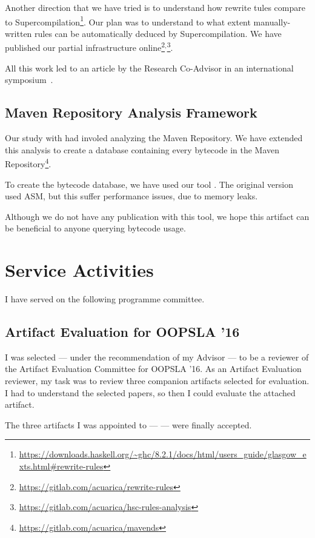 Another direction that we have tried is to understand how rewrite tules compare to Supercompilation\footnote{\url{https://downloads.haskell.org/~ghc/8.2.1/docs/html/users_guide/glasgow_exts.html\#rewrite-rules}}.
Our plan was to understand to what extent manually-written rules can be automatically deduced by Supercompilation.
We have published our partial infrastructure online\footnote{\url{https://gitlab.com/acuarica/rewrite-rules}}$^{,}$\footnote{\url{https://gitlab.com/acuarica/hsc-rules-analysis}}.

All this work led to an article by the Research Co-Advisor in an international symposium~\cite{Nystrom:2017bp}.

\subsection*{Maven Repository Analysis Framework}

Our study with \smu{} had involed analyzing the Maven Repository.
We have extended this analysis to create a database containing every bytecode in the Maven Repository\footnote{\url{https://gitlab.com/acuarica/mavends}}.

To create the bytecode database, we have used our tool \jnif{}.
The original version used ASM, but this suffer performance issues, due to memory leaks. 

Although we do not have any publication with this tool, we hope this artifact can be beneficial to anyone querying bytecode usage.

\section{Service Activities} \label{sec:service}

I have served on the following programme committee.

\subsection*{Artifact Evaluation for OOPSLA '16}

I was selected --- under the recommendation of my Advisor --- to be a reviewer of the Artifact Evaluation Committee for OOPSLA '16.
As an Artifact Evaluation reviewer, my task was to review three companion artifacts selected for evaluation.
I had to understand the selected papers, so then I could evaluate the attached artifact.

The three artifacts I was appointed to --- \cite{Ancona:2016km,DiLorenzo:2016dd,Stefanescu:2016bq} --- were finally accepted.
